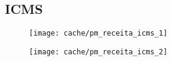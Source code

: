 
\subsection{ICMS}





\begin{figure}[H]
\center
\texttt{[image: cache/pm\_receita\_icms\_1]}
\end{figure}

\begin{figure}[H]
\center
\texttt{[image: cache/pm\_receita\_icms\_2]}
\end{figure}
